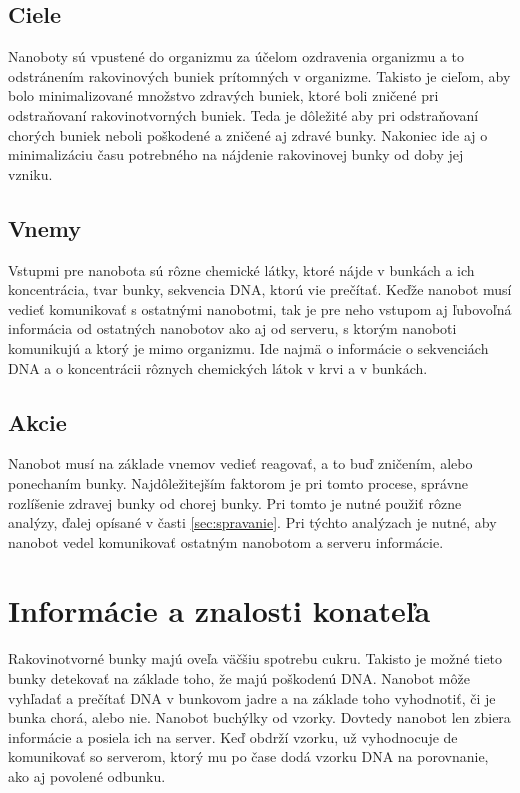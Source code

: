 \documentclass[10pt,twoside,slovak,a4paper]{article}
\begin{document}
\subsection{Ciele}
Nanoboty sú vpustené do organizmu za účelom ozdravenia organizmu a to odstránením rakovinových buniek prítomných v organizme. Takisto je cieľom, aby bolo minimalizované množstvo zdravých buniek, ktoré boli zničené pri odstraňovaní rakovinotvorných buniek. Teda je dôležité aby pri odstraňovaní chorých buniek neboli poškodené a zničené aj zdravé bunky. Nakoniec ide aj o minimalizáciu času potrebného na nájdenie rakovinovej bunky od doby jej vzniku.

\subsection{Vnemy}
Vstupmi pre nanobota sú rôzne chemické látky, ktoré nájde v bunkách a ich koncentrácia, tvar bunky, sekvencia DNA, ktorú vie prečítať. Keďže nanobot musí vedieť komunikovať s ostatnými nanobotmi, tak je pre neho vstupom aj ľubovoľná informácia od ostatných nanobotov ako aj od serveru, s ktorým nanoboti komunikujú a ktorý je mimo organizmu. Ide najmä o informácie o sekvenciách DNA a o koncentrácii rôznych chemických látok v krvi a v bunkách.

\subsection{Akcie}
Nanobot musí na základe vnemov vedieť reagovať, a to buď zničením, alebo ponechaním bunky. Najdôležitejším faktorom je pri tomto procese, správne rozlíšenie zdravej bunky od chorej bunky. Pri tomto je nutné použiť rôzne analýzy, ďalej opísané v časti \ref{sec:spravanie}. Pri týchto analýzach je nutné, aby nanobot vedel komunikovať ostatným nanobotom a serveru informácie.


\section{Informácie a znalosti konateľa}
\label{sec:znalosti}
Rakovinotvorné bunky majú oveľa väčšiu spotrebu cukru. Takisto je možné tieto bunky detekovať na základe toho, že majú poškodenú DNA. Nanobot môže vyhľadať a prečítať DNA v bunkovom jadre a na základe toho vyhodnotiť, či je bunka chorá, alebo nie.
\cite{Wikipedia-nador,cancer-cell-metabolism}
Nanobot buchýlky od vzorky. Dovtedy nanobot len zbiera informácie a posiela ich na server. Keď obdrží vzorku, už vyhodnocuje de komunikovať so serverom, ktorý mu po čase dodá vzorku DNA na porovnanie, ako aj povolené odbunku.
\end{document}
